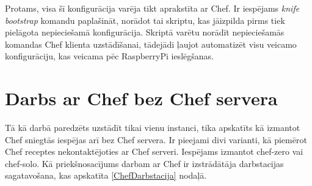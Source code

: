 Protams, visa šī konfigurācija varēja tikt aprakstīta ar Chef. Ir iespējams \textit{knife bootstrap} komandu paplašināt, norādot tai skriptu, kas jāizpilda pirms tiek pielāgota nepieciešamā konfigurācija. Skriptā varētu norādīt nepieciešamās komandas Chef klienta uzstādīšanai, tādejādi ļaujot automatizēt visu veicamo konfigurāciju, kas veicama pēc RaspberryPi ieslēgšanas.


\section{Darbs ar Chef bez Chef servera}
Tā kā darbā paredzēts uzstādīt tikai vienu instanci, tika apskatīts kā izmantot Chef sniegtās iespējas arī bez Chef servera. Ir pieejami divi varianti, kā piemērot Chef receptes nekontaktējoties ar Chef serveri. Iespējams izmantot chef-zero vai chef-solo.
Kā priekšnosacījums darbam ar Chef ir izstrādātāja darbstacijas sagatavošana, kas apskatīta \ref{ChefDarbstacija} nodaļā.
